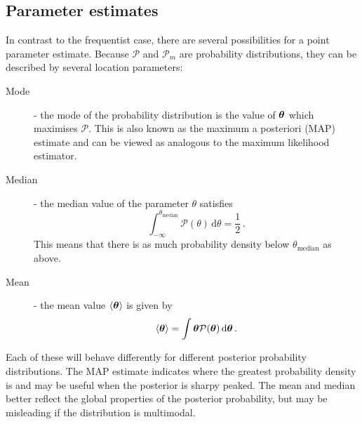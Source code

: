 \subsection{Parameter estimates}

In contrast to the frequentist case, there are several possibilities for a point parameter estimate. Because $\mathcal{P}$ and $\mathcal{P}_m$ are probability distributions, they can be described by several location parameters:

\begin{description}
\item[Mode] - the mode of the probability distribution is the value of $\boldsymbol\theta$ which maximises $\mathcal{P}$. This is also known as the maximum a posteriori (MAP) estimate and can be viewed as analogous to the maximum likelihood estimator.
\item[Median] - the median value of the parameter $\theta$ satisfies
\begin{equation}
\int_{-\infty}^{\theta_\textrm{median}} \mathcal{P}(\theta) \, \mathrm{d}\theta = \frac{1}{2}\,.
\end{equation}
This means that there is as much probability density below $\theta_\textrm{median}$ as above.
\item[Mean] - the mean value $\langle \boldsymbol\theta \rangle$ is given by
\begin{equation}
\langle \boldsymbol\theta \rangle = \int \boldsymbol\theta \mathcal{P}(\boldsymbol\theta) \, \mathrm{d}\boldsymbol\theta\,.
\end{equation}
\end{description}
Each of these will behave differently for different posterior probability distributions. The MAP estimate indicates where the greatest probability density is and may be useful when the posterior is sharpy peaked. The mean and median better reflect the global properties of the posterior probability, but may be misleading if the distribution is multimodal.


